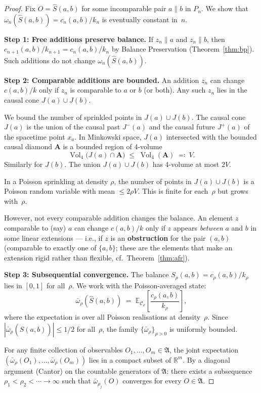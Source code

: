 \documentclass[11pt]{article}
\newcommand{\expect}{\mathbb{E}}
\DeclareMathOperator{\Vol}{Vol}
\begin{document}
\begin{proof}
Fix $O = \hat{S}(a,b)$ for some incomparable pair
$a \parallel b$ in $P_n$.  We show that
$\omega_n(\hat{S}(a,b)) = c_n(a,b)/k_n$ is eventually
constant in~$n$.

\textbf{Step 1: Free additions preserve balance.}
If $z_n \parallel a$ and $z_n \parallel b$, then
$c_{n+1}(a,b)/k_{n+1} = c_n(a,b)/k_n$ by Balance
Preservation (Theorem~\ref{thm:bp}).  Such additions do
not change $\omega_n(\hat{S}(a,b))$.

\textbf{Step 2: Comparable additions are bounded.}
An addition $z_n$ can change $c(a,b)/k$ only if $z_n$
is comparable to $a$ or $b$ (or both).  Any such $z_n$
lies in the causal cone $J(a) \cup J(b)$.

We bound the number of sprinkled points in $J(a) \cup J(b)$.
The causal cone $J(a)$ is the union of the causal past
$J^-(a)$ and the causal future $J^+(a)$ of the spacetime
point $x_a$.  In Minkowski space, $J(a)$ intersected with
the bounded causal diamond $\mathbf{A}$ is a bounded
region of 4-volume
\[
  \Vol_4\bigl(J(a) \cap \mathbf{A}\bigr)
  \;\le\; \Vol_4(\mathbf{A})
  \;\eqqcolon\; V.
\]
Similarly for $J(b)$.  The union $J(a) \cup J(b)$ has
4-volume at most $2V$.

In a Poisson sprinkling at density $\rho$, the number of
points in $J(a) \cup J(b)$ is a Poisson random variable
with mean $\le 2\rho V$.  This is finite for each~$\rho$
but grows with~$\rho$.

However, not every comparable addition changes the balance.
An element $z$ comparable to (say) $a$ can change $c(a,b)/k$
only if $z$ appears \emph{between} $a$ and $b$ in some
linear extensions --- i.e., if $z$ is an
\textbf{obstruction} for the pair $(a,b)$
(comparable to exactly one of $\{a,b\}$; these are the
elements that make an extension rigid rather than flexible,
cf.\ Theorem~\ref{thm:afr}).

\textbf{Step 3: Subsequential convergence.}
The balance $S_\rho(a,b) = c_\rho(a,b)/k_\rho$ lies in
$[0, 1]$ for all~$\rho$.  We work with the Poisson-averaged
state:
\[
  \bar{\omega}_\rho(\hat{S}(a,b))
  \;=\; \expect_{\mathcal{C}_\rho}\!\left[
    \frac{c_\rho(a,b)}{k_\rho}
  \right],
\]
where the expectation is over all Poisson realisations at
density~$\rho$.  Since
$|\bar{\omega}_\rho(\hat{S}(a,b))| \le 1/2$ for all~$\rho$,
the family $\{\bar{\omega}_\rho\}_{\rho > 0}$ is uniformly
bounded.

For any finite collection of observables
$O_1, \ldots, O_m \in \mathfrak{A}$, the joint expectation
$(\bar{\omega}_\rho(O_1), \ldots, \bar{\omega}_\rho(O_m))$
lies in a compact subset of $\mathbb{R}^m$.  By a diagonal
argument (Cantor) on the countable generators of
$\mathfrak{A}$: there exists a subsequence
$\rho_1 < \rho_2 < \cdots \to \infty$ such that
$\bar{\omega}_{\rho_j}(O)$ converges for every
$O \in \mathfrak{A}$.


\end{proof}
\end{document}
